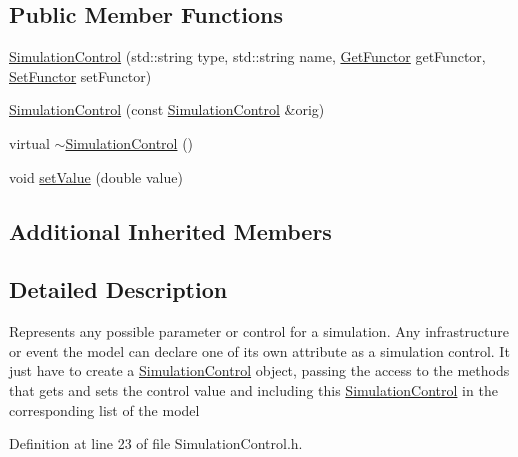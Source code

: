 \subsection*{Public Member Functions}
\begin{DoxyCompactItemize}
\item 
\hyperlink{class_simulation_control_abc4b94dcd52bf60db702206e324481a5}{Simulation\-Control} (std\-::string type, std\-::string name, \hyperlink{_functor_8h_a69893c7d35bc5c3bdb40b1034fe4838e}{Get\-Functor} get\-Functor, \hyperlink{_functor_8h_a60162e2fcd32c651903530f47a55f6c9}{Set\-Functor} set\-Functor)
\item 
\hyperlink{class_simulation_control_a12851e6e9168d46c2a9761ac52b6b49c}{Simulation\-Control} (const \hyperlink{class_simulation_control}{Simulation\-Control} \&orig)
\item 
virtual \hyperlink{class_simulation_control_ae6e46cf7af75d2d6755bcb99ac1a6b23}{$\sim$\-Simulation\-Control} ()
\item 
void \hyperlink{class_simulation_control_a72fafddaf6615fe33a29b49fc08a218a}{set\-Value} (double value)
\end{DoxyCompactItemize}
\subsection*{Additional Inherited Members}


\subsection{Detailed Description}
Represents any possible parameter or control for a simulation. Any infrastructure or event the model can declare one of its own attribute as a simulation control. It just have to create a \hyperlink{class_simulation_control}{Simulation\-Control} object, passing the access to the methods that gets and sets the control value and including this \hyperlink{class_simulation_control}{Simulation\-Control} in the corresponding list of the model 

Definition at line 23 of file Simulation\-Control.\-h.



